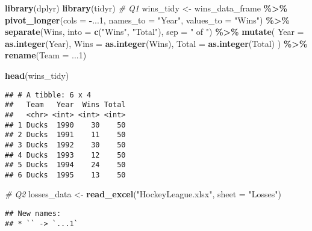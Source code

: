 \documentclass[
]{article}
\newenvironment{Shaded}{\begin{snugshade}}{\end{snugshade}}
\newcommand{\AttributeTok}[1]{\textcolor[rgb]{0.13,0.29,0.53}{#1}}
\newcommand{\CommentTok}[1]{\textcolor[rgb]{0.56,0.35,0.01}{\textit{#1}}}
\newcommand{\DecValTok}[1]{\textcolor[rgb]{0.00,0.00,0.81}{#1}}
\newcommand{\FunctionTok}[1]{\textcolor[rgb]{0.13,0.29,0.53}{\textbf{#1}}}
\newcommand{\NormalTok}[1]{#1}
\newcommand{\OtherTok}[1]{\textcolor[rgb]{0.56,0.35,0.01}{#1}}
\newcommand{\SpecialCharTok}[1]{\textcolor[rgb]{0.81,0.36,0.00}{\textbf{#1}}}
\newcommand{\StringTok}[1]{\textcolor[rgb]{0.31,0.60,0.02}{#1}}
\begin{document}
\begin{Shaded}
\begin{Highlighting}[]
\FunctionTok{library}\NormalTok{(dplyr)}
\FunctionTok{library}\NormalTok{(tidyr)}
\CommentTok{\# Q1}
\NormalTok{wins\_tidy }\OtherTok{\textless{}{-}}\NormalTok{ wins\_data\_frame }\SpecialCharTok{\%\textgreater{}\%}
    \FunctionTok{pivot\_longer}\NormalTok{(}\AttributeTok{cols =} \SpecialCharTok{{-}}\NormalTok{...}\DecValTok{1}\NormalTok{, }\AttributeTok{names\_to =} \StringTok{"Year"}\NormalTok{, }\AttributeTok{values\_to =} \StringTok{"Wins"}\NormalTok{) }\SpecialCharTok{\%\textgreater{}\%}
    \FunctionTok{separate}\NormalTok{(Wins, }\AttributeTok{into =} \FunctionTok{c}\NormalTok{(}\StringTok{"Wins"}\NormalTok{, }\StringTok{"Total"}\NormalTok{), }\AttributeTok{sep =} \StringTok{" of "}\NormalTok{) }\SpecialCharTok{\%\textgreater{}\%}
    \FunctionTok{mutate}\NormalTok{(}
        \AttributeTok{Year =} \FunctionTok{as.integer}\NormalTok{(Year),}
        \AttributeTok{Wins =} \FunctionTok{as.integer}\NormalTok{(Wins),}
        \AttributeTok{Total =} \FunctionTok{as.integer}\NormalTok{(Total)}
\NormalTok{    ) }\SpecialCharTok{\%\textgreater{}\%}
    \FunctionTok{rename}\NormalTok{(}\AttributeTok{Team =}\NormalTok{ ...}\DecValTok{1}\NormalTok{)}


\FunctionTok{head}\NormalTok{(wins\_tidy)}
\end{Highlighting}
\end{Shaded}

\begin{verbatim}
## # A tibble: 6 x 4
##   Team   Year  Wins Total
##   <chr> <int> <int> <int>
## 1 Ducks  1990    30    50
## 2 Ducks  1991    11    50
## 3 Ducks  1992    30    50
## 4 Ducks  1993    12    50
## 5 Ducks  1994    24    50
## 6 Ducks  1995    13    50
\end{verbatim}

\begin{Shaded}
\begin{Highlighting}[]
\CommentTok{\# Q2}
\NormalTok{losses\_data }\OtherTok{\textless{}{-}} \FunctionTok{read\_excel}\NormalTok{(}\StringTok{"HockeyLeague.xlsx"}\NormalTok{, }\AttributeTok{sheet =} \StringTok{"Losses"}\NormalTok{)}
\end{Highlighting}
\end{Shaded}

\begin{verbatim}
## New names:
## * `` -> `...1`
\end{verbatim}
\end{document}
